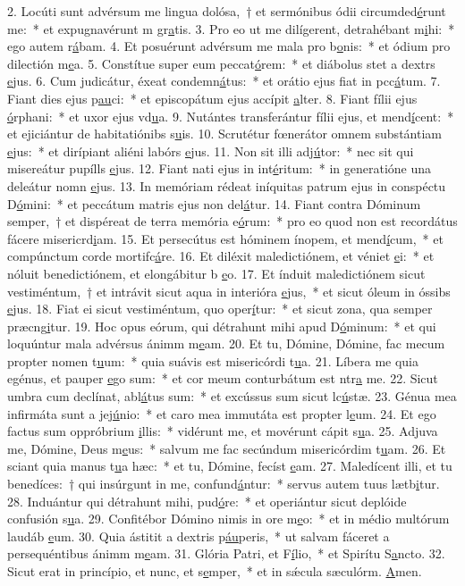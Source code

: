 2. Locúti sunt advérsum me lingua dolósa,~† et sermónibus ódii circumded\uline{é}runt me:~* et expugnavérunt m gr\uline{a}tis.
3. Pro eo ut me dilígerent, detrahébant m\uline{i}hi:~* ego autem r\uline{á}bam.
4. Et posuérunt advérsum me mala pro b\uline{o}nis:~* et ódium pro dilectión m\uline{e}a.
5. Constítue super eum peccat\uline{ó}rem:~* et diábolus stet a dextrs \uline{e}jus.
6. Cum judicátur, éxeat condemn\uline{á}tus:~* et orátio ejus fiat in pcc\uline{á}tum.
7. Fiant dies ejus p\uline{au}ci:~* et episcopátum ejus accípit \uline{a}lter.
8. Fiant fílii ejus \uline{ó}rphani:~* et uxor ejus vd\uline{u}a.
9. Nutántes transferántur fílii ejus, et mend\uline{í}cent:~* et ejiciántur de habitatiónibs s\uline{u}is.
10. Scrutétur fœnerátor omnem substántiam \uline{e}jus:~* et dirípiant aliéni labórs \uline{e}jus.
11. Non sit illi adj\uline{ú}tor:~* nec sit qui misereátur pupílls \uline{e}jus.
12. Fiant nati ejus in int\uline{é}ritum:~* in generatióne una deleátur nomn \uline{e}jus.
13. In memóriam rédeat iníquitas patrum ejus in conspéctu D\uline{ó}mini:~* et peccátum matris ejus non del\uline{á}tur.
14. Fiant contra Dóminum semper,~† et dispéreat de terra memória e\uline{ó}rum:~* pro eo quod non est recordátus fácere misericrd\uline{i}am.
15. Et persecútus est hóminem ínopem, et mend\uline{í}cum,~* et compúnctum corde mortifc\uline{á}re.
16. Et diléxit maledictiónem, et véniet \uline{e}i:~* et nóluit benedictiónem, et elongábitur b \uline{e}o.
17. Et índuit maledictiónem sicut vestiméntum,~† et intrávit sicut aqua in interióra \uline{e}jus,~* et sicut óleum in óssibs \uline{e}jus.
18. Fiat ei sicut vestiméntum, quo oper\uline{í}tur:~* et sicut zona, qua semper præcng\uline{i}tur.
19. Hoc opus eórum, qui détrahunt mihi apud D\uline{ó}minum:~* et qui loquúntur mala advérsus ánimm m\uline{e}am.
20. Et tu, Dómine, Dómine, fac mecum propter nomen t\uline{u}um:~* quia suávis est misericórdi t\uline{u}a.
21. Líbera me quia egénus, et pauper \uline{e}go sum:~* et cor meum conturbátum est ntr\uline{a} me.
22. Sicut umbra cum declínat, abl\uline{á}tus sum:~* et excússus sum sicut lc\uline{ú}stæ.
23. Génua mea infirmáta sunt a jej\uline{ú}nio:~* et caro mea immutáta est propter l\uline{e}um.
24. Et ego factus sum oppróbrium \uline{i}llis:~* vidérunt me, et movérunt cápit s\uline{u}a.
25. Adjuva me, Dómine, Deus m\uline{e}us:~* salvum me fac secúndum misericórdim t\uline{u}am.
26. Et sciant quia manus t\uline{u}a hæc:~* et tu, Dómine, fecíst \uline{e}am.
27. Maledícent illi, et tu benedíces:~† qui insúrgunt in me, confund\uline{á}ntur:~* servus autem tuus lætb\uline{i}tur.
28. Induántur qui détrahunt mihi, pud\uline{ó}re:~* et operiántur sicut deplóide confusión s\uline{u}a.
29. Confitébor Dómino nimis in ore m\uline{e}o:~* et in médio multórum laudáb \uline{e}um.
30. Quia ástitit a dextris p\uline{áu}peris,~* ut salvam fáceret a persequéntibus ánimm m\uline{e}am.
31. Glória Patri, et F\uline{í}lio,~* et Spirítu S\uline{a}ncto.
32. Sicut erat in princípio, et nunc, et s\uline{e}mper,~* et in sǽcula sæculórm. \uline{A}men.
